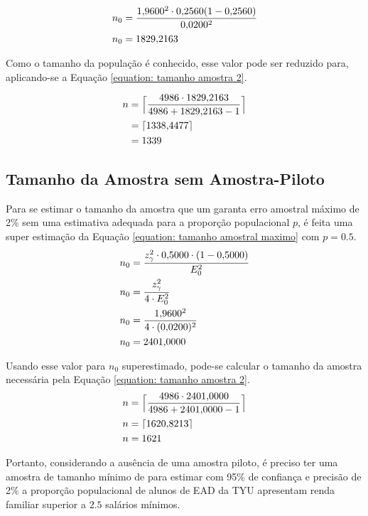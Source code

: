 	\begin{align*}
		n_0 &= \frac{\num{1.96}^2 \cdot \num{0.256}(1-\num{0.256})}{\num{0.02}^2} \\
		n_0 &= \num{1829.216256}
	\end{align*}

	Como o tamanho da população é conhecido, esse valor pode ser reduzido
	para, aplicando-se a Equação \ref{equation: tamanho amostra 2}.

	\begin{align*}
		n &= \Big\lceil \frac{4986 \cdot  \num{1829.216256}}{4986 + \num{1829.216256} - 1} \Big\rceil \\
		  &= \lceil \num{1338.447749567} \rceil \\
		  &= 1339
	\end{align*}


\subsection{Tamanho da Amostra sem Amostra-Piloto}

	Para se estimar o tamanho da amostra que um garanta erro amostral máximo de
	2\% sem uma estimativa adequada para a proporção populacional $p$, é
	feita uma super estimação da Equação \ref{equation: tamanho amostral
	maximo} com $p = 0.5$.
	\begin{align*}
		n_0 &= \frac{z_\gamma^2 \cdot \num{0.5} \cdot (1 - \num{0.5})}{E_0^2} \\
		n_0 &= \frac{z_\gamma^2}{4 \cdot E_0^2} \\
		n_0 &= \frac{\num{1.96}^2}{4 \cdot (\num{0.02})^2} \\
		n_0 &= \num{2401.0000}
	\end{align*}

	Usando esse valor para $n_0$ superestimado, pode-se calcular o tamanho da
	amostra necessária pela Equação \ref{equation: tamanho amostra 2}.
	\begin{align*}
		n &= \Big\lceil \frac{4986 \cdot \num{2401.0000}}{4986 + \num{2401.0000} - 1} \Big\rceil \\
		n &= \lceil \num{1620.8213} \rceil \\
		n &= 1621
	\end{align*}

	Portanto, considerando a ausência de uma amostra piloto, é preciso ter uma
	amostra de tamanho mínimo de \SEISCnceil para estimar com 95\% de
	confiança e precisão de 2\% a proporção populacional de alunos de EAD da TYU
	apresentam renda familiar superior a $\num{2,5}$ salários mínimos.


